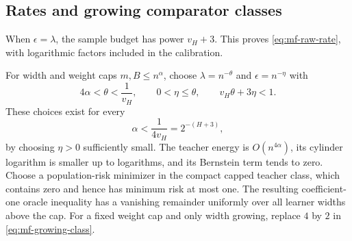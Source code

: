 \subsection{Rates and growing comparator classes}

When $\epsilon=\lambda$, the sample budget has power $v_H+3$.
This proves \eqref{eq:mf-raw-rate}, with logarithmic factors included in
the calibration.

For width and weight caps $m,B\le n^\alpha$, choose
$\lambda=n^{-\theta}$ and $\epsilon=n^{-\eta}$ with
\[
 4\alpha<\theta<\frac1{v_H},\qquad
 0<\eta\le\theta,\qquad
 v_H\theta+3\eta<1.
\]
These choices exist for every
\begin{equation}\label{eq:mf-growing-class}
 \alpha<\frac1{4v_H}=2^{-(H+3)},
\end{equation}
by choosing $\eta>0$ sufficiently small.
The teacher energy is $O(n^{4\alpha})$, its cylinder logarithm is
smaller up to logarithms, and its Bernstein term tends to zero.
Choose a population-risk minimizer in the compact capped teacher class,
which contains zero and hence has minimum risk at most one.
The resulting coefficient-one oracle inequality has a vanishing
remainder uniformly over all learner widths above the cap.  For a fixed
weight cap and only width growing, replace $4$ by $2$ in
\eqref{eq:mf-growing-class}.
